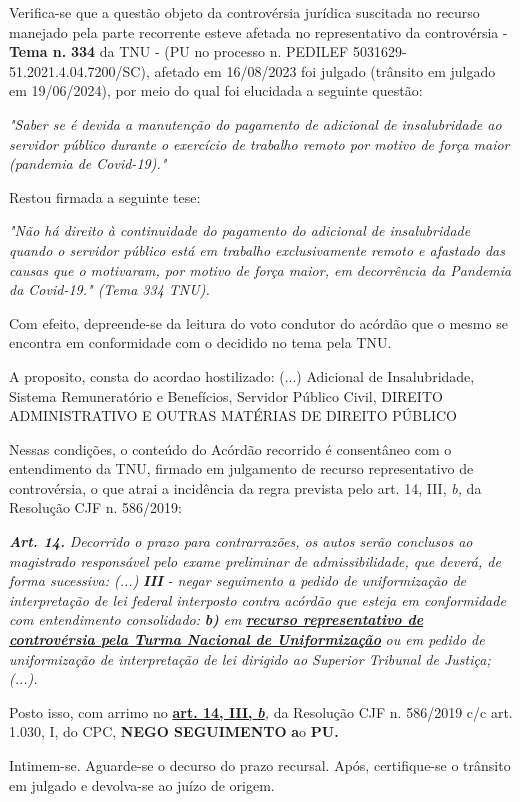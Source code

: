 \documentclass[12pt]{article}
\begin{document}
\justifying
\noindent Verifica-se que a questão objeto da controvérsia jurídica suscitada no recurso manejado pela parte recorrente esteve afetada no representativo da controvérsia - \textbf{Tema n. }\textbf{334} da TNU - (PU no processo n. PEDILEF 5031629-51.2021.4.04.7200/SC),  afetado em 16/08/2023 foi julgado (trânsito em julgado em 19/06/2024), por meio do qual foi elucidada a seguinte questão:

\noindent \textit{"Saber se é devida a manutenção do pagamento de adicional de insalubridade ao servidor público durante o exercício de trabalho remoto por motivo de força maior (pandemia de Covid-19)."}

\noindent Restou firmada a seguinte tese:

\noindent \textit{"Não há direito à continuidade do pagamento do adicional de insalubridade quando o servidor público está em trabalho exclusivamente remoto e afastado das causas que o motivaram, por motivo de força maior, em decorrência da Pandemia da Covid-19." (Tema 334 TNU).}

\noindent Com efeito, depreende-se da leitura do voto condutor do acórdão que o mesmo se encontra em conformidade com o decidido no  tema pela TNU.

\noindent A proposito, consta do acordao hostilizado: (...) Adicional de Insalubridade, Sistema Remuneratório e Benefícios, Servidor Público Civil, DIREITO ADMINISTRATIVO E OUTRAS MATÉRIAS DE DIREITO PÚBLICO

\noindent Nessas condições, o conteúdo do Acórdão recorrido é consentâneo com o entendimento da TNU, firmado em julgamento de recurso representativo de controvérsia, o que atrai a incidência da regra prevista pelo art. 14, III, \textit{b,} da Resolução CJF n. 586/2019:

\noindent \textit{\textbf{Art. 14.}}\textit{ Decorrido o prazo para contrarrazões, os autos serão conclusos ao magistrado responsável pelo exame preliminar de admissibilidade, que deverá, de forma sucessiva: (...) }\textit{\textbf{III }}\textit{- negar seguimento a pedido de uniformização de interpretação de lei federal interposto contra acórdão que esteja em conformidade com entendimento consolidado: }\textit{\textbf{b)}}\textit{ em }\uline{\textit{\textbf{recurso representativo de controvérsia pela Turma Nacional de Uniformização}}}\textit{ ou em pedido de uniformização de interpretação de lei dirigido ao Superior Tribunal de Justiça;(...).}

\noindent Posto isso, com arrimo no \uline{\textbf{art. 14, III, }}\uline{\textit{\textbf{b}}}\textit{,} da Resolução CJF n. 586/2019 c/c art. 1.030, I, do CPC, \textbf{NEGO SEGUIMENTO }\textbf{a}o\textbf{ PU}\textbf{.}

\noindent Intimem-se. Aguarde-se o decurso do prazo recursal. Após, certifique-se o trânsito em julgado e devolva-se ao juízo de origem.
\end{document}
